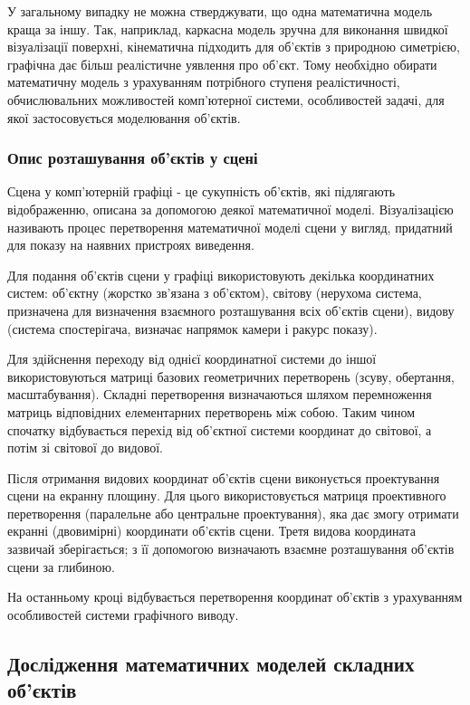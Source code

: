 \let\mypdfximage\pdfximage\def\pdfximage{\immediate\mypdfximage}\documentclass[14pt,a4paper]{extarticle}
\theoremstyle{definition}
\renewcommand{\[}{\begin{singlespace}\begin{equation*}}
\renewcommand{\]}{\end{equation*}\end{singlespace}}
\renewcommand{\+}{\discretionary{\mbox{\scriptsize$\hookleftarrow$}}{}{}}
\begin{document}
У загальному випадку не можна стверджувати, що одна математична модель краща за іншу. Так, наприклад, каркасна модель зручна для виконання швидкої візуалізації поверхні, кінематична підходить для  об'єктів з природною симетрією, графічна дає більш реалістичне уявлення про об'єкт.  Тому необхідно обирати математичну модель з урахуванням потрібного ступеня реалістичності, обчислювальних можливостей комп'ютерної системи, особливостей задачі, для якої застосовується моделювання об'єктів.

\subsubsection{Опис розташування об'єктів у сцені}

Сцена у комп'ютерній графіці - це сукупність об'єктів, які підлягають відображенню, описана за допомогою деякої математичної моделі. Візуалізацією називають процес перетворення математичної моделі сцени у вигляд, придатний для показу на наявних пристроях виведення.

Для подання об'єктів сцени у графіці використовують декілька координатних систем: об'єктну (жорстко зв'язана з об'єктом), світову (нерухома система, призначена для визначення взаємного розташування всіх об'єктів сцени), видову (система спостерігача, визначає напрямок камери і ракурс показу).

Для здійснення переходу від однієї координатної системи до іншої використовуються матриці базових геометричних перетворень (зсуву, обертання, масштабування). Складні перетворення визначаються шляхом перемноження матриць відповідних елементарних перетворень між собою. Таким чином спочатку відбувається перехід від об'єктної системи координат до світової, а потім зі світової до видової.

Після отримання видових координат об'єктів сцени виконується проектування сцени на екранну площину. Для цього використовується матриця проективного перетворення (паралельне або центральне проектування), яка дає змогу отримати екранні (двовимірні) координати об'єктів сцени. Третя видова координата зазвичай зберігається; з її допомогою визначають взаємне розташування об'єктів сцени за глибиною.

На останньому кроці відбувається перетворення координат об’єктів з урахуванням особливостей системи графічного виводу.

\subsection{Дослідження математичних моделей складних об'єктів}
\end{document}
